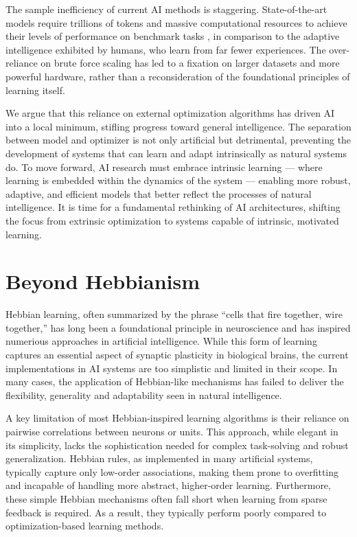 \documentclass{article}
\begin{document}
The sample inefficiency of current AI methods is
staggering. State-of-the-art models require trillions of tokens and
massive computational resources to achieve their levels of performance on
benchmark tasks \cite{openai2024gpt4technicalreport},
in comparison to the adaptive intelligence exhibited by humans,
who learn from far fewer experiences. The over-reliance on brute force scaling has
led to a fixation on larger datasets and more powerful hardware, rather
than a reconsideration of the foundational principles of learning itself.

We argue that this reliance on external optimization algorithms has
driven AI into a local minimum, stifling progress toward general
intelligence. The separation between model and optimizer is not only
artificial but detrimental, preventing the development of systems that can
learn and adapt intrinsically as natural systems do. To move
forward, AI research must embrace intrinsic learning --- where learning
is embedded within the dynamics of the system --- enabling more robust,
adaptive, and efficient models that better reflect the processes of
natural intelligence. It is time for a fundamental rethinking
of AI architectures, shifting the focus from extrinsic optimization to
systems capable of intrinsic, motivated learning.


\section{Beyond Hebbianism}

Hebbian learning, often summarized by the phrase ``cells that fire
together, wire together,'' has long been a foundational principle
in neuroscience and has inspired numerious approaches in artificial
intelligence. While this form of learning captures an essential aspect of
synaptic plasticity in biological brains, the current implementations in
AI systems are too simplistic and limited in their scope. In many cases,
the application of Hebbian-like mechanisms has failed to deliver the
flexibility, generality and adaptability seen in natural intelligence.

A key limitation of most Hebbian-inspired learning algorithms is
their reliance on pairwise correlations between neurons or
units. This approach, while elegant in its simplicity,
lacks the sophistication needed for complex task-solving and robust
generalization. Hebbian rules, as implemented in many artificial systems,
typically capture only low-order associations, making them prone
to overfitting and incapable of handling more abstract, higher-order
learning. Furthermore, these simple Hebbian mechanisms often fall
short when learning from sparse feedback is required.
As a result, they typically perform poorly compared to
optimization-based learning methods.
\end{document}
